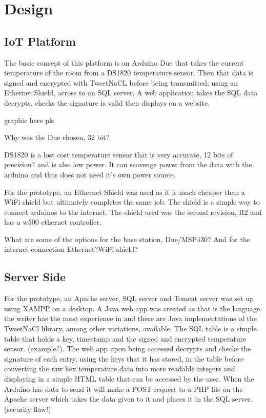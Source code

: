 
\chapter{Design}
\label{design}



\section{IoT Platform}

The basic concept of this platform is an Arduino Due that takes the current temperature of the room from a DS1820 temperature sensor. Then that data is signed and encrypted with TweetNaCL before being transmitted, using an Ethernet Shield, across to an SQL server. A web application takes the SQL data decrypts, checks the signature is valid then displays on a website. 

graphic here pls

Why was the Due chosen, 32 bit?

DS1820 is a lost cost temperature sensor that is very accurate, 12 bits of precision? and is also low power. It can scavenge power from the data with the arduino and thus does not need it's own power source. 


For the prototype, an Ethernet Shield was used as it is much cheaper than a WiFi shield but ultimately completes the same job. The shield is a simple way to connect arduinos to the internet. The shield used was the second revision, R2 and has a w500 ethernet controller. 


What are some of the options for the base station, Due/MSP430?  And for the internet connection   Ethernet?WiFi shield?

\section{Server Side}

For the prototype, an Apache server, SQL server and Tomcat server was set up using XAMPP on a desktop. A Java web app was created as that is the language the writer has the most experience in and there are Java implementations of the TweetNaCl library, among other variations, available. The SQL table is a simple table that holds a key, timestamp and the signed and encrypted temperature sensor. (example?). The web app upon being accessed decrypts and checks the signature of each entry, using the keys that it has stored, in the table before converting the raw hex temperature data into more readable integers and displaying in a simple HTML table that can be accessed by the user. When the Arduino has data to send it will make a POST request to a PHP file on the Apache server which takes the data given to it and places it in the SQL server. (security flaw!)


